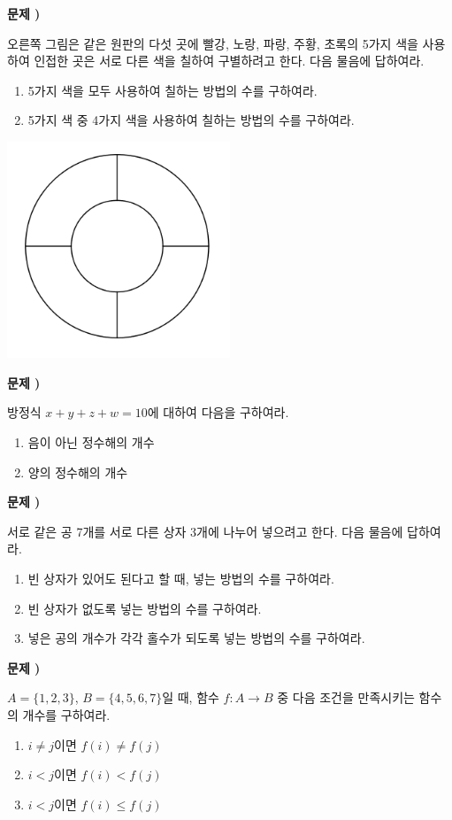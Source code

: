 \documentclass[a4paper]{oblivoir}
\newcounter{num}
\newcommand\prob[1]
{\vs\bigskip\par\noindent\stepcounter{num} \textbf{문제 \thenum) #1}\par\noindent}
\newcommand\vs[1]{\vspace{70pt}}
\begin{document}
%
\prob{}
\begin{minipage}{0.45\textwidth}
오른쪽 그림은 같은 원판의 다섯 곳에 빨강, 노랑, 파랑, 주황, 초록의 5가지 색을 사용하여 인접한 곳은 서로 다른 색을 칠하여 구별하려고 한다.
다음 물음에 답하여라.
\begin{enumerate}[(1)]
\item
5가지 색을 모두 사용하여 칠하는 방법의 수를 구하여라.
\item
5가지 색 중 4가지 색을 사용하여 칠하는 방법의 수를 구하여라.
\end{enumerate}
\end{minipage}
\begin{minipage}{0.45\textwidth}
\includegraphics[width=0.5\textwidth]{paint}
\end{minipage}


%
\prob{}
방정식 \(x+y+z+w=10\)에 대하여 다음을 구하여라.
\begin{enumerate}[(1)]
\item
음이 아닌 정수해의 개수
\item
양의 정수해의 개수
\end{enumerate}

%
\prob{}
서로 같은 공 7개를 서로 다른 상자 3개에 나누어 넣으려고 한다.
다음 물음에 답하여라.
\begin{enumerate}[(1)]
\item
빈 상자가 있어도 된다고 할 때, 넣는 방법의 수를 구하여라.
\item
빈 상자가 없도록 넣는 방법의 수를 구하여라.
\item
넣은 공의 개수가 각각 홀수가 되도록 넣는 방법의 수를 구하여라.
\end{enumerate}

%
\prob{}
\(A=\{1,2,3\}\), \(B=\{4,5,6,7\}\)일 때, 함수 \(f:A\to B\) 중 다음 조건을 만족시키는 함수의 개수를 구하여라.
\begin{enumerate}[(1)]
\item
\(i\neq j\)이면 \(f(i)\neq f(j)\)
\item
\(i<j\)이면 \(f(i)<f(j)\)
\item
\(i<j\)이면 \(f(i)\le f(j)\)
\end{enumerate}
\end{document}
